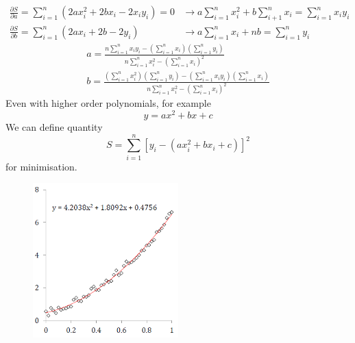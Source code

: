 \documentclass[class=report, crop=false, 12pt,a4paper]{standalone}
\begin{document}
\begin{align}
  \frac{\partial S}{\partial a} = \sum_{i = 1}^n (2 ax_i^2 + 2bx_i - 2x_i y_i) = 0 &\rightarrow a\sum_{i=1}^n x_i^2 + b\sum_{i +1}^n x_i = \sum_{i=1}^n x_i y_i\\
  \frac{\partial S}{\partial b} = \sum_{i=1}^n (2ax_i + 2b - 2y_i) &\rightarrow a\sum_{i=1}^n x_i + nb = \sum_{i=1}^n y_i
\end{align}
\begin{gather}
  a = \frac{n \sum_{i=1}^n x_i y_i - \left(\sum_{i=1}^n x_i\right)\left(\sum_{i=1}^n y_i\right)}{n\sum_{i=1}^n x_i^2 - \left(\sum_{i=1}^n x_i\right)^2}\\
  b = \frac{\left(\sum_{i=1}^n x_i^2\right) \left(\sum_{i=1}^n y_i\right) - \left(\sum_{i=1}^n x_i y_i\right)\left(\sum_{i=1}^n x_i\right)}{n\sum_{i=1}^n x_i^2 - \left(\sum_{i=1}^n x_i\right)^2}
\end{gather}
Even with higher order polynomials, for example
\begin{equation}
  y = ax^2 + bx + c
\end{equation}
We can define quantity
\begin{equation}
  S = \sum_{i=1}^n [y_i - (ax_i^2 + bx_i +c)]^2
\end{equation}
for minimisation.
\begin{figure}[H]
  \centering
  \includegraphics[width = 0.5\textwidth]{../img/diagram66.png}
\end{figure}
\end{document}
